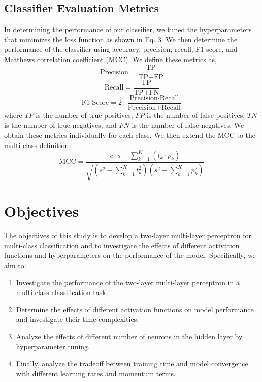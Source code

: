 \documentclass{acm_proc_article-sp}
\begin{document}
\subsection{Classifier Evaluation Metrics}
In determining the performance of our classifier, we tuned the hyperparameters that minimizes the loss function as shown in Eq. 3. We then determine the performance of the classifier using accuracy, precision, recall, F1 score, and Matthews correlation coefficient (MCC). We define these metrics as,
\begin{equation}
    \text{Precision} = \frac{\text{TP}}{\text{TP} + \text{FP}}
\end{equation}
\begin{equation}
    \text{Recall} = \frac{\text{TP}}{\text{TP} + \text{FN}}
\end{equation}
\begin{equation}
    \text{F1 Score} = 2 \cdot \frac{\text{Precision} \cdot \text{Recall}}{\text{Precision} + \text{Recall}}
\end{equation}
where $TP$ is the number of true positives, $FP$ is the number of false positives, $TN$ is the number of true negatives, and $FN$ is the number of false negatives. We obtain these metrics individually for each class. We then extend the MCC to the multi-class definition,
\begin{equation}
    \text{MCC} = \frac{ c \cdot s - \sum_{k=1}^{K} (t_k \cdot p_k) }{ \sqrt{ \left( s^2 - \sum_{k=1}^{K} t_k^2 \right) \left( s^2 - \sum_{k=1}^{K} p_k^2 \right) } }
\end{equation}

\section{Objectives}
The objectives of this study is to develop a two-layer multi-layer perceptron for multi-class classification and to investigate the effects of different activation functions and hyperparameters on the performance of the model. Specifically, we aim to:
\begin{enumerate}
    \item Investigate the performance of the two-layer multi-layer perceptron in a multi-class classification task.
    \item Determine the effects of different activation functions on model performance and investigate their time complexities.
    \item Analyze the effects of different number of neurons in the hidden layer by hyperparameter tuning.
    \item Finally, analyze the tradeoff between training time and model convergence with different learning rates and momentum terms.

\end{enumerate}
\end{document}
